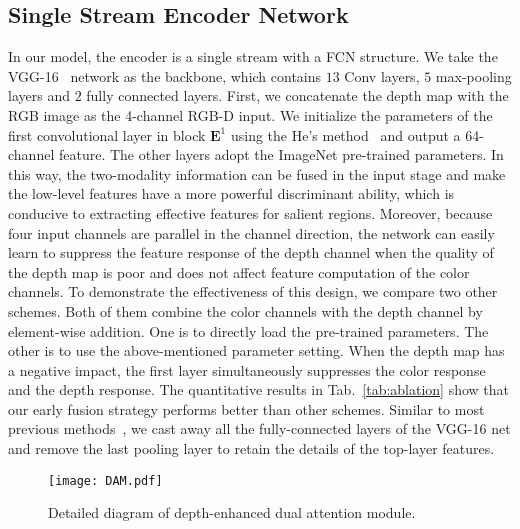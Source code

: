 \documentclass[runningheads]{llncs}
\begin{document}
\subsection{Single Stream Encoder Network}\label{sec:Encoder_Network}
In our model, the encoder is a single stream with a FCN structure. We take the VGG-16~\cite{VGG} network as the backbone, which contains $13$ Conv layers, $5$ max-pooling layers and $2$ fully connected layers. First, we concatenate the depth map with the RGB image as the 4-channel RGB-D input. 
We initialize the parameters of the first convolutional layer in block $\mathbf{E}^1$ using the He's method~\cite{PRelu} and output a 64-channel feature. The other layers adopt the ImageNet pre-trained parameters. In this way, the two-modality information can be fused in the input stage and make the low-level features have a more powerful discriminant ability, which is conducive to extracting effective features for salient regions. 
Moreover, because four input channels are parallel in the channel direction, the network can easily learn to suppress the feature response of the depth channel when the quality of the depth map is poor and does not affect feature computation of the color channels. To demonstrate the effectiveness of this design, we compare two other schemes. Both of them combine the color channels with the depth channel by element-wise addition. One is to directly load the pre-trained parameters. The other is to use the above-mentioned parameter setting. When the depth map has a negative impact, the first layer simultaneously suppresses the color response and the depth response. The quantitative results in Tab.~\ref{tab:ablation} show that our early fusion strategy performs better than other schemes.  
Similar to most previous methods~\cite{PDNet,PCA,CPFP,TANet,AF_RGBD,DMRA}, we cast away all the fully-connected layers of the VGG-16 net and remove the last pooling layer to retain the details of the top-layer features.


\begin{figure}[t]
\centering
\texttt{[image: DAM.pdf]}\\
\caption{Detailed diagram of depth-enhanced dual attention module.}
\label{fig:DAM}
\end{figure}
\end{document}
